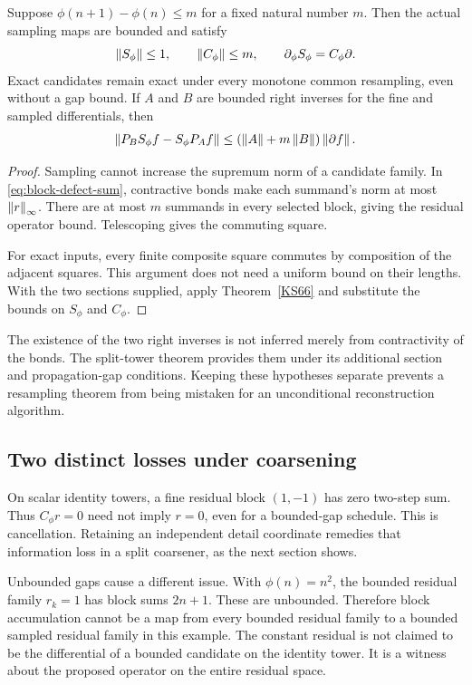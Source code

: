 \begin{theorem}\label{KS67}
Suppose \(\phi(n+1)-\phi(n)\le m\) for a fixed natural number \(m\). Then the actual sampling maps are bounded and satisfy
\[
 \left\lVert S_\phi\right\rVert\le1,\qquad \left\lVert C_\phi\right\rVert\le m,
 \qquad \partial_\phi S_\phi=C_\phi\partial.
\]
Exact candidates remain exact under every monotone common resampling, even without a gap bound. If \(A\) and \(B\) are bounded right inverses for the fine and sampled differentials, then
\[
 \left\lVert P_BS_\phi f-S_\phi P_Af\right\rVert
 \le(\left\lVert A\right\rVert+m\left\lVert B\right\rVert)\left\lVert\partial f\right\rVert.
\]
\end{theorem}
\begin{proof}
Sampling cannot increase the supremum norm of a candidate family. In \eqref{eq:block-defect-sum}, contractive bonds make each summand's norm at most \(\left\lVert r\right\rVert_\infty\). There are at most \(m\) summands in every selected block, giving the residual operator bound. Telescoping gives the commuting square.

For exact inputs, every finite composite square commutes by composition of the adjacent squares. This argument does not need a uniform bound on their lengths. With the two sections supplied, apply Theorem~\ref{KS66} and substitute the bounds on \(S_\phi\) and \(C_\phi\).
\end{proof}
The existence of the two right inverses is not inferred merely from contractivity of the bonds. The split-tower theorem provides them under its additional section and propagation-gap conditions. Keeping these hypotheses separate prevents a resampling theorem from being mistaken for an unconditional reconstruction algorithm.

\subsection{Two distinct losses under coarsening}
On scalar identity towers, a fine residual block \((1,-1)\) has zero two-step sum. Thus \(C_\phi r=0\) need not imply \(r=0\), even for a bounded-gap schedule. This is cancellation. Retaining an independent detail coordinate remedies that information loss in a split coarsener, as the next section shows.

Unbounded gaps cause a different issue. With \(\phi(n)=n^2\), the bounded residual family \(r_k=1\) has block sums \(2n+1\). These are unbounded. Therefore block accumulation cannot be a map from every bounded residual family to a bounded sampled residual family in this example. The constant residual is not claimed to be the differential of a bounded candidate on the identity tower. It is a witness about the proposed operator on the entire residual space.

